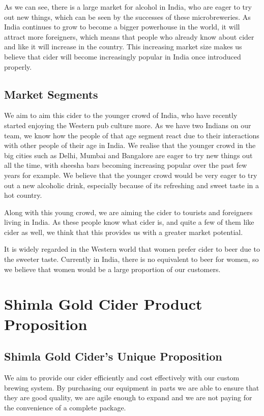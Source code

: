 \documentclass[11pt]{article}
\begin{document}
As we can see, there is a large market for alcohol in India, who are eager to try out new things, which can be seen by the successes of these microbreweries. As India continues to grow to become a bigger powerhouse in the world, it will attract more foreigners, which means that people who already know about cider and like it will increase in the country. This increasing market size makes us believe that cider will become increasingly popular in India once introduced properly.

  \subsection{Market Segments}
  We aim to aim this cider to the younger crowd of India, who have recently
  started enjoying the Western pub culture more. As we have two Indians on our
  team, we know how the people of that age segment react due to their interactions
  with other people of their age in India. We realise that the younger crowd in
  the big cities such as Delhi, Mumbai and Bangalore are eager to try new things
  out all the time, with sheesha bars becoming increasing popular over the past
  few years for example. We believe that the younger crowd would be very eager to
  try out a new alcoholic drink, especially because of its refreshing and sweet
  taste in a hot country.

Along with this young crowd, we are aiming the cider to tourists and foreigners
living in India. As these people know what cider is, and quite a few of them
like cider as well, we think that this provides us with a greater market
potential.

It is widely regarded in the Western world that women prefer cider to beer due
to the sweeter taste. Currently in India, there is no equivalent to beer for
women, so we believe that women would be a large proportion of our customers.

\newpage
\section{Shimla Gold Cider Product Proposition}

\subsection{Shimla Gold Cider's Unique Proposition}
We aim to provide our cider efficiently and cost effectively with our custom
brewing system. By purchasing our equipment in parts we are able to ensure that
they are good quality, we are agile enough to expand and we are not paying for
the convenience of a complete package.
\end{document}
